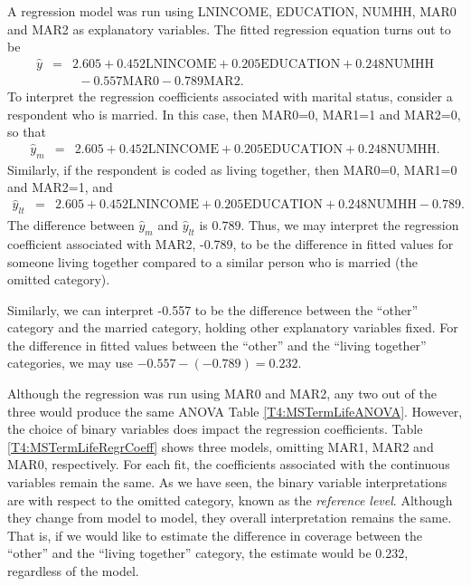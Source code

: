 A regression model was run using LNINCOME, EDUCATION, NUMHH, MAR0
and MAR2 as explanatory variables. The fitted regression equation
turns out to be
\begin{eqnarray*}
\widehat{y} &=& 2.605 + 0.452 \textrm{LNINCOME} +0.205
\textrm{EDUCATION} + 0.248 \textrm{NUMHH} \\
 & & ~~ -0.557 \textrm{MAR0} -0.789 \textrm{MAR2}.
\end{eqnarray*}
To interpret the regression coefficients associated with marital
status, consider a respondent who is married. In this case, then
MAR0=0, MAR1=1 and MAR2=0, so that
\begin{eqnarray*}
\widehat{y}_m &=& 2.605 + 0.452 \textrm{LNINCOME} +0.205
\textrm{EDUCATION} + 0.248 \textrm{NUMHH} .
\end{eqnarray*}
Similarly, if the respondent is coded as living together, then
MAR0=0, MAR1=0 and MAR2=1, and
   \begin{eqnarray*}
\widehat{y}_{lt} &=& 2.605 + 0.452 \textrm{LNINCOME} +0.205
\textrm{EDUCATION} + 0.248 \textrm{NUMHH} -0.789.
\end{eqnarray*}
The difference between $\widehat{y}_m$ and $\widehat{y}_{lt}$ is
$0.789.$ Thus, we may interpret the regression coefficient
associated with MAR2, -0.789, to be the difference in fitted values
for someone living together compared to a similar person who is
married (the omitted category).

Similarly, we can interpret -0.557 to be the difference between the
``other'' category and the married category, holding other
explanatory variables fixed. For the difference in fitted values
between the ``other'' and the ``living together'' categories, we may
use $-0.557 - (-0.789) = 0.232.$

Although the regression was run using MAR0 and MAR2, any two out of
the three would produce the same ANOVA Table
\ref{T4:MSTermLifeANOVA}. However, the choice of binary variables
does impact the regression coefficients. Table
\ref{T4:MSTermLifeRegrCoeff} shows three models, omitting MAR1, MAR2
and MAR0, respectively. For each fit, the coefficients associated
with the continuous variables remain the same. As we have seen, the
binary variable interpretations are with respect to the omitted
category, known as the \emph{reference level}. Although they change
from model to model, they overall interpretation remains the same.
That is, if we would like to estimate the difference in coverage
between the ``other'' and the ``living together'' category, the
estimate would be 0.232, regardless of the model.

